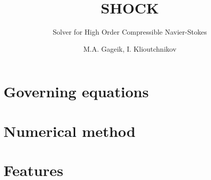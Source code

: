 \documentclass[a4paper,11pt]{scrartcl}
\begin{document}
\title{SHOCK}
\subtitle{\Large{S}\normalsize olver for \Large{H}\normalsize igh \Large{O}\normalsize rder \Large{C}\normalsize ompressible Navier-Sto\Large{k}\normalsize es}
\author{M.A. Gageik, I. Klioutchnikov}


\maketitle


\section{Governing equations}


\section{Numerical method}


\section{Features}




\appendix
\tiny
\begin{landscape}

\end{landscape}
\end{document}
